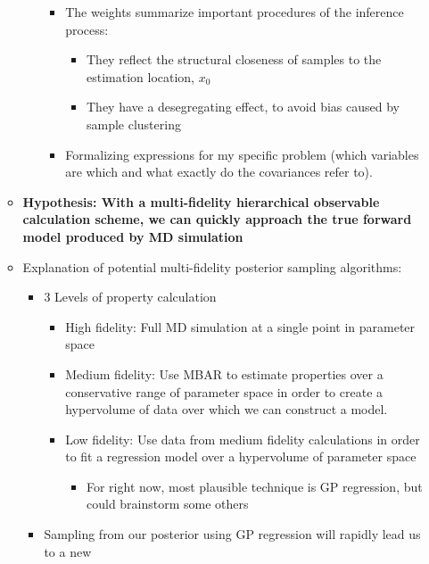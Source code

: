 \documentclass[aps,pre,nofootinbib,superscriptaddress,linenumbers,10pt, draft,tightenlines]{revtex4-1}
\begin{document}
\begin{itemize}
\begin{itemize}
\begin{itemize}
\begin{itemize}
                \item The weights summarize important procedures of the 
                      inference process:    	
                \begin{itemize}
                	\item They reflect the structural closeness of 
                	      samples to the estimation location, $x_0$
                	\item They have a desegregating effect, to avoid
                	      bias caused by sample clustering
                \end{itemize}
                \item Formalizing expressions for my specific problem (which variables are which
                      and what exactly do the covariances refer to).
            \end{itemize}
    	\end{itemize}
        \item \textbf{Hypothesis: With a multi-fidelity hierarchical observable calculation
               scheme, we can quickly approach the true forward model produced 
        	   by MD simulation}
        \item Explanation of potential multi-fidelity posterior sampling algorithms:
        \begin{itemize}
        	\item 3 Levels of property calculation
        	\begin{itemize}
        		\item High fidelity: Full MD simulation at a single point in parameter space
        		\item Medium fidelity: Use MBAR to estimate properties over a conservative 
                      range of parameter space in order to create a hypervolume of data
        		      over which we can construct a model.
        		\item Low fidelity: Use data from medium fidelity calculations in order to fit
                      a regression model over a hypervolume of parameter space
        		\begin{itemize}
        			\item For right now, most plausible technique is GP regression, but 
                          could brainstorm some others
        		\end{itemize}
            \end{itemize}    
            \item Sampling from our posterior using GP regression will rapidly lead us to a new 

\end{itemize}
\end{itemize}
\end{itemize}
\end{document}
